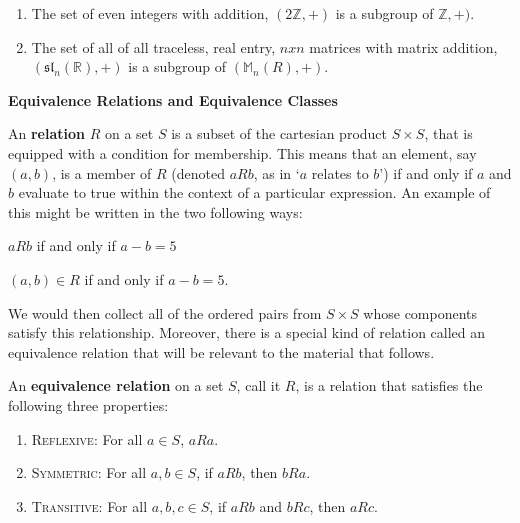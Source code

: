 \documentclass[12pt, a4paper]{article}
\begin{document}
\begin{enumerate}

    \item The set of even integers with addition, $(2\mathbb{Z}, +)$ is a subgroup of $\mathbb{Z}, +)$.
    
    \item The set of all of all traceless, real entry, $nxn$ matrices with matrix addition, $(\mathfrak{sl}_n(\mathbb{R}), +)$ is a subgroup of $(\mathbb{M}_n(R), +)$.
    
\end{enumerate}


\begin{flushleft}

\vspace{1mm}
    \textbf{\large{Equivalence Relations and Equivalence Classes}}\normalsize
    
\end{flushleft}

    An \textbf{relation} $R$ on a set $S$ is a subset of the cartesian product $S\times S$, that is equipped with a condition for membership. This means that an element, say $(a,b)$, is a member of $R$ (denoted $aRb$, as in `$a$ relates to $b$') if and only if $a$ and $b$ evaluate to true within the context of a particular expression. An example of this might be written in the two following ways:\par
    
\vspace{4mm}

        \centerline{$aRb$ if and only if $a-b=5$}
        
    
\vspace{2mm}

        \centerline{$(a,b)\in R$ if and only if $a-b=5$.}
        
\vspace{4mm}

    We would then collect all of the ordered pairs from $S\times S$ whose components satisfy this relationship. Moreover, there is a special kind of relation called an equivalence relation that will be relevant to the material that follows.\par
    
    An \textbf{equivalence relation} on a set $S$, call it $R$, is a relation that satisfies the following three properties:\par
    


\begin{enumerate}

    \item \textsc{Reflexive: }For all $a\in S$, $aRa$.
    
    \item \textsc{Symmetric: }For all $a,b\in S$, if $aRb$, then $bRa$.
    
    \item \textsc{Transitive: }For all $a,b,c\in S$, if $aRb$ and $bRc$, then $aRc$.
    
\end{enumerate}
\end{document}
